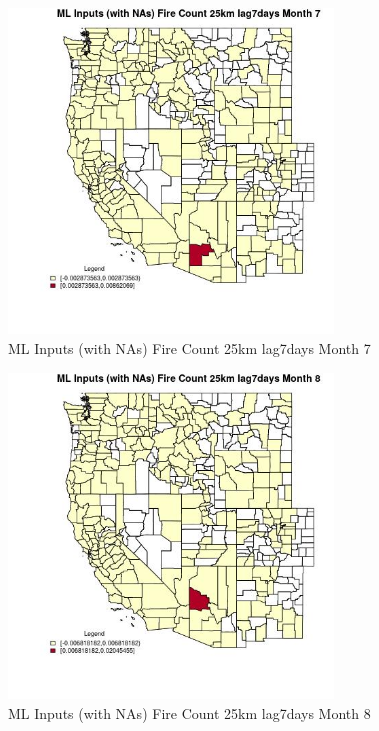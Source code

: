 \begin{figure} 
\centering  
\includegraphics[width=0.77\textwidth]{Code_Outputs/Report_ML_input_PM25_Step4_part_e_de_duplicated_aves_compiled_2019-05-21wNAs_CountyFire_Count_25km_lag7daysmedianMonth7.jpg} 
\caption{\label{fig:Report_ML_input_PM25_Step4_part_e_de_duplicated_aves_compiled_2019-05-21wNAsCountyFire_Count_25km_lag7daysmedianMonth7}ML Inputs (with NAs) Fire Count 25km lag7days Month 7} 
\end{figure} 
 

\begin{figure} 
\centering  
\includegraphics[width=0.77\textwidth]{Code_Outputs/Report_ML_input_PM25_Step4_part_e_de_duplicated_aves_compiled_2019-05-21wNAs_CountyFire_Count_25km_lag7daysmedianMonth8.jpg} 
\caption{\label{fig:Report_ML_input_PM25_Step4_part_e_de_duplicated_aves_compiled_2019-05-21wNAsCountyFire_Count_25km_lag7daysmedianMonth8}ML Inputs (with NAs) Fire Count 25km lag7days Month 8} 
\end{figure} 
 

